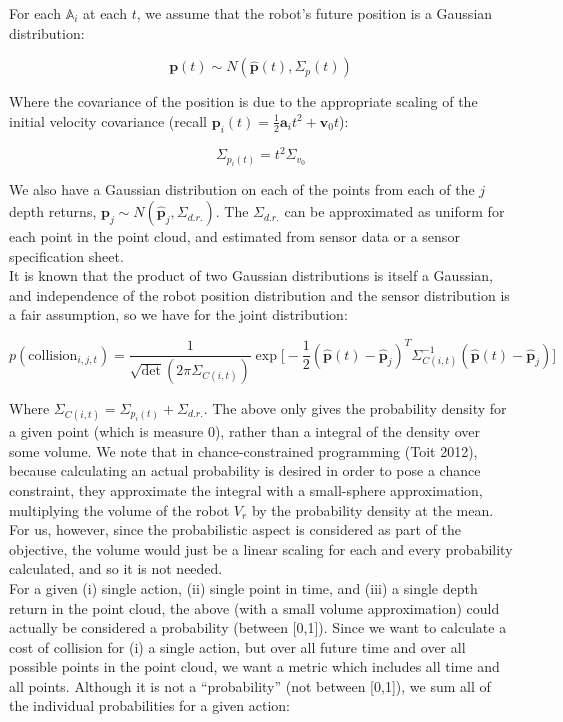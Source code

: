 \documentclass[paper=a4, fontsize=11pt]{scrartcl} %
\numberwithin{equation}{section} %
\numberwithin{figure}{section} %
\numberwithin{table}{section} %
\begin{document}
For each $\mathbb{A}_i$ at each $t$, we assume that the robot's future position is a Gaussian distribution: 

$$\mathbf{p}(t) \sim N(\mathbf{\hat{p}}(t), \Sigma_p(t))$$

Where the covariance of the position is due to the appropriate scaling of the initial velocity covariance (recall $ \textbf{p}_i(t) = \frac{1}{2} \textbf{a}_i t^2 + \mathbf{v}_0 t$):

$$ \Sigma_{p_i(t)} = t^2 \Sigma_{v_0}$$

We also have a Gaussian distribution on each of the points from each of the $j$ depth returns, $\mathbf{p}_{j} \sim N(\mathbf{\hat{p}}_{j}, \Sigma_{d.r.})$.  The $\Sigma_{d.r.}$ can be approximated as uniform for each point in the point cloud, and estimated from sensor data or a sensor specification sheet.\\

It is known that the product of two Gaussian distributions is itself a Gaussian, and independence of the robot position distribution and the sensor distribution is a fair assumption, so we have for the joint distribution:

$$ p(\text{collision}_{i,j,t}) = \frac{1}{\sqrt{\text{det}}(2 \pi \Sigma_{C(i, t)})} \exp \big[  -\frac{1}{2}(\mathbf{\hat{p}}(t) - \mathbf{\hat{p}}_{j})^T \Sigma_{C(i, t)}^{-1} (\mathbf{\hat{p}}(t) - \mathbf{\hat{p}}_{j}) \big] $$

Where $\Sigma_{C(i, t)} = \Sigma_{p_i(t)} + \Sigma_{d.r.}$.  The above only gives the probability density for a given point (which is measure 0), rather than a integral of the density over some volume.  We note that in chance-constrained programming (Toit 2012), because calculating an actual probability is desired in order to pose a chance constraint, they approximate the integral with a small-sphere approximation, multiplying the volume of the robot $V_r$ by the probability density at the mean.  For us, however, since the probabilistic aspect is considered as part of the objective, the volume would just be a linear scaling for each and every probability calculated, and so it is not needed.\\

For a given (i) single action, (ii) single point in time, and (iii) a single depth return in the point cloud, the above (with a small volume approximation) could actually be considered a probability (between [0,1]).  Since we want to calculate a cost of collision for (i) a single action, but over all future time and over all possible points in the point cloud, we want a metric which includes all time and all points.  Although it is not a ``probability'' (not between [0,1]), we sum all of the individual probabilities for a given action:
\end{document}
